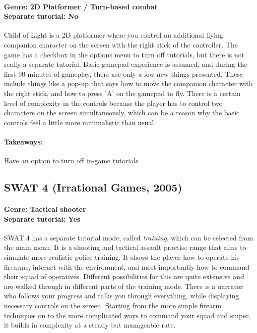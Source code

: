 \paragraph{Genre: 2D Platformer / Turn-based combat \\ Separate tutorial: No \\}
Child of Light is a 2D platformer where you control an additional flying companion character on the screen with the right stick of the controller. The game has a checkbox in the options menu to turn off tutorials, but there is not really a separate tutorial. Basic gamepad experience is assumed, and during the first 90 minutes of gameplay, there are only a few new things presented. These include things like a pop-up that says how to move the companion character with the right stick, and how to press 'A' on the gamepad to fly. There is a certain level of complexity in the controls because the player has to control two characters on the screen simultaneously, which can be a reason why the basic controls feel a little more minimalistic than usual.
\paragraph{Takeaways:}
Have an option to turn off in-game tutorials.

\subsection{SWAT 4 (Irrational Games, 2005)}
\paragraph{Genre: Tactical shooter \\ Separate tutorial: Yes \\}
SWAT 4 has a separate tutorial mode, called \textit{training}, which can be selected from the main menu. It is a shooting and tactical assault practise range that aims to simulate more realistic police training. It shows the player how to operate his firearms, interact with the environment, and most importantly how to command their squad of operatives. Different possibilities for this are quite extensive and are walked through in different parts of the training mode. There is a narrator who follows your progress and talks you through everything, while displaying necessary controls on the screen. Starting from the more simple firearm techniques on to the more complicated ways to command your squad and sniper, it builds in complexity at a steady but manageable rate.
